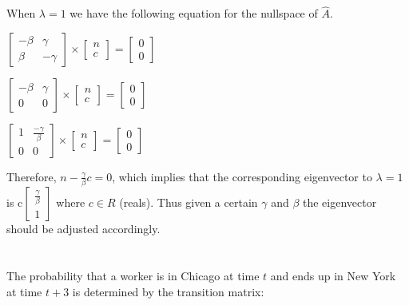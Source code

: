 \documentclass[11pt, oneside]{article}   	%
\begin{document}
When $\lambda = 1$ we have the following equation for the nullspace of $\hat{A}$. 

$\begin{bmatrix} -\beta & \gamma \\ \beta & -\gamma \end{bmatrix} \times 
\left[ \begin{array}{c} n \\ c \end{array} \right] = 
\left[ \begin{array}{c} 0 \\ 0 \end{array} \right]$


$\begin{bmatrix} -\beta & \gamma \\ 0 & 0 \end{bmatrix} \times 
\left[ \begin{array}{c} n \\ c \end{array} \right] = 
\left[ \begin{array}{c} 0 \\ 0 \end{array} \right]$


$\begin{bmatrix} 1 & \frac{-\gamma}{\beta} \\ 0 & 0 \end{bmatrix} \times 
\left[ \begin{array}{c} n \\ c \end{array} \right] = 
\left[ \begin{array}{c} 0 \\ 0 \end{array} \right]$


Therefore, $n-\frac{\gamma}{\beta}c = 0$, which implies that the corresponding eigenvector to 
$\lambda = 1$ is c$\left[ \begin{array}{c} \frac{\gamma}{\beta} \\ 1 \end{array} \right]$ where $c \in R$ (reals). Thus given a certain $\gamma$ and $\beta$ the eigenvector should be adjusted accordingly. 

\section{}
The probability that a worker is in Chicago at time $t$ and ends up in New York at time $t+3$ is determined by the transition matrix:
\end{document}
